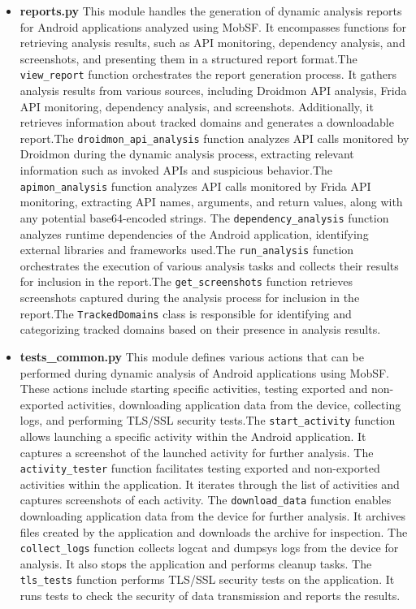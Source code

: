 \documentclass{report}
\begin{document}
\begin{itemize}
\begin{itemize}
        \item \textbf{reports.py}
        This module handles the generation of dynamic analysis reports for Android applications analyzed using MobSF. It encompasses functions for retrieving analysis results, such as API monitoring, dependency analysis, and screenshots, and presenting them in a structured report format.The \texttt{view\_report} function orchestrates the report generation process. It gathers analysis results from various sources, including Droidmon API analysis, Frida API monitoring, dependency analysis, and screenshots. Additionally, it retrieves information about tracked domains and generates a downloadable report.The \texttt{droidmon\_api\_analysis} function analyzes API calls monitored by Droidmon during the dynamic analysis process, extracting relevant information such as invoked APIs and suspicious behavior.The \texttt{apimon\_analysis} function analyzes API calls monitored by Frida API monitoring, extracting API names, arguments, and return values, along with any potential base64-encoded strings. The \texttt{dependency\_analysis} function analyzes runtime dependencies of the Android application, identifying external libraries and frameworks used.The \texttt{run\_analysis} function orchestrates the execution of various analysis tasks and collects their results for inclusion in the report.The \texttt{get\_screenshots} function retrieves screenshots captured during the analysis process for inclusion in the report.The \texttt{TrackedDomains} class is responsible for identifying and categorizing tracked domains based on their presence in analysis results.
        
        \item \textbf {tests\_common.py}
        This module defines various actions that can be performed during dynamic analysis of Android applications using MobSF. These actions include starting specific activities, testing exported and non-exported activities, downloading application data from the device, collecting logs, and performing TLS/SSL security tests.The \texttt{start\_activity} function allows launching a specific activity within the Android application. It captures a screenshot of the launched activity for further analysis.
        The \texttt{activity\_tester} function facilitates testing exported and non-exported activities within the application. It iterates through the list of activities and captures screenshots of each activity. The \texttt{download\_data} function enables downloading application data from the device for further analysis. It archives files created by the application and downloads the archive for inspection. The \texttt{collect\_logs} function collects logcat and dumpsys logs from the device for analysis. It also stops the application and performs cleanup tasks. The \texttt{tls\_tests} function performs TLS/SSL security tests on the application. It runs tests to check the security of data transmission and reports the results.


\end{itemize}
\end{itemize}
\end{document}
